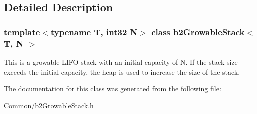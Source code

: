 \subsection{Detailed Description}
\subsubsection*{template$<$typename T, int32 N$>$\newline
class b2\+Growable\+Stack$<$ T, N $>$}

This is a growable L\+I\+FO stack with an initial capacity of N. If the stack size exceeds the initial capacity, the heap is used to increase the size of the stack. 

The documentation for this class was generated from the following file\+:\begin{DoxyCompactItemize}
\item 
Common/b2\+Growable\+Stack.\+h\end{DoxyCompactItemize}
